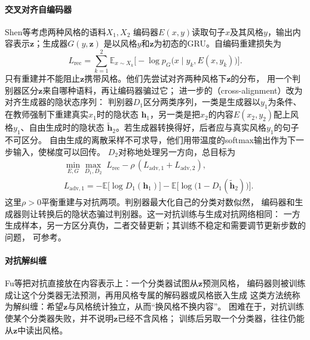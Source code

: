 \paragraph{交叉对齐自编码器}
Shen等考虑两种风格的语料$X_1,X_2$
编码器$E(x,y)$读取句子$x$及其风格$y$，输出内容表示$\bm z$；生成器$G(y,\bm z)$
是以风格$y$和$\bm z$为初态的GRU。自编码重建损失为
\begin{equation}
  L_{\mathrm{rec}}=\sum_{k=1}^{2}\mathbb{E}_{x\sim X_k}
  \bigl[-\log p_G\bigl(x\mid y_k,E(x,y_k)\bigr)\bigr].
  \label{eq:nlp-generation-shen-rec}
\end{equation}
只有重建并不能阻止$\bm z$携带风格。他们先尝试对齐两种风格下$\bm z$的分布，
用一个判别器区分$\bm z$来自哪种语料，再让编码器骗过它；
进一步的（cross-alignment）改为对齐生成器的隐状态序列：
判别器$D_1$区分两类序列，一类是生成器以$y_1$为条件、在教师强制下重建真实$x_1$时的隐状态
$\bm h_1$，另一类是把$x_2$的内容$E(x_2,y_2)$配上风格$y_1$、自由生成时的隐状态
$\tilde{\bm h}_2$。若生成器转换得好，后者应与真实风格$y_1$的句子不可区分。
自由生成的离散采样不可求导，他们用带温度的softmax输出作为下一步输入，使梯度可以回传。
$D_2$对称地处理另一方向，总目标为
\begin{equation}
  \begin{aligned}
    &\min_{E,G}\max_{D_1,D_2}\;L_{\mathrm{rec}}
    -\rho\,(L_{\mathrm{adv},1}+L_{\mathrm{adv},2}),\\
    &L_{\mathrm{adv},1}=-\mathbb{E}\bigl[\log D_1(\bm h_1)\bigr]
    -\mathbb{E}\bigl[\log\bigl(1-D_1(\tilde{\bm h}_2)\bigr)\bigr].
  \end{aligned}
  \label{eq:nlp-generation-shen-adv}
\end{equation}
这里$\rho>0$平衡重建与对抗两项。判别器最大化自己的分类对数似然，
编码器和生成器则让转换后的隐状态骗过判别器。这一对抗训练与生成对抗网络相同：
一方生成样本，另一方区分真伪，二者交替更新；其训练不稳定和需要调节更新步数的问题，
可参考。

\paragraph{对抗解纠缠}
Fu等把对抗直接放在内容表示上：一个分类器试图从$\bm z$预测风格，
编码器则被训练成让这个分类器无法预测，再用风格专属的解码器或风格嵌入生成
这类方法统称为解纠缠：希望$\bm z$与风格统计独立，从而“换风格不换内容”。
困难在于，对抗训练使某个分类器失败，并不说明$\bm z$已经不含风格；
训练后另取一个分类器，往往仍能从$\bm z$中读出风格。

